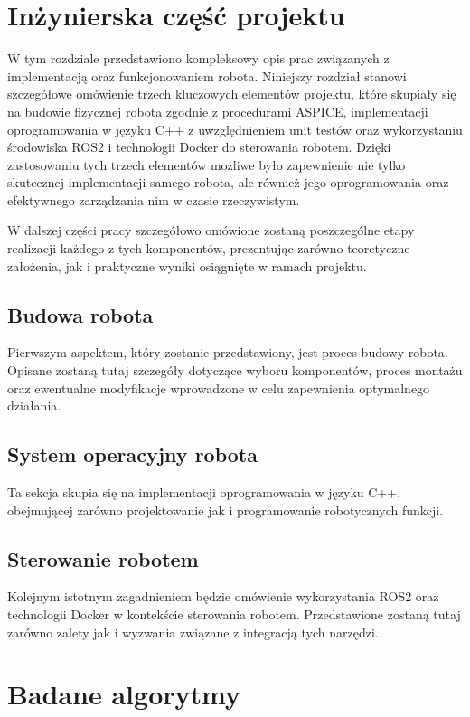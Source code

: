 \documentclass[12pt,twoside]{article}
\begin{document}
\section{Inżynierska część projektu}

W tym rozdziale przedstawiono kompleksowy opis prac związanych z implementacją oraz funkcjonowaniem robota. Niniejszy rozdział stanowi szczegółowe omówienie trzech kluczowych elementów projektu, które skupiały się na budowie fizycznej robota zgodnie z procedurami ASPICE, implementacji oprogramowania w języku C++ z uwzględnieniem unit testów oraz wykorzystaniu środowiska ROS2 i technologii Docker do sterowania robotem. Dzięki zastosowaniu tych trzech elementów możliwe było zapewnienie nie tylko skutecznej implementacji samego robota, ale również jego oprogramowania oraz efektywnego zarządzania nim w czasie rzeczywistym.

W dalszej części pracy szczegółowo omówione zostaną poszczególne etapy realizacji każdego z tych komponentów, prezentując zarówno teoretyczne założenia, jak i praktyczne wyniki osiągnięte w ramach projektu.

\subsection{Budowa robota}

Pierwszym aspektem, który zostanie przedstawiony, jest proces budowy robota. Opisane zostaną tutaj szczegóły dotyczące wyboru komponentów, proces montażu oraz ewentualne modyfikacje wprowadzone w celu zapewnienia optymalnego działania.

\subsection{System operacyjny robota}

Ta sekcja skupia się na implementacji oprogramowania w języku C++, obejmującej zarówno projektowanie jak i programowanie robotycznych funkcji. 

\subsection{Sterowanie robotem}

Kolejnym istotnym zagadnieniem będzie omówienie wykorzystania ROS2 oraz technologii Docker w kontekście sterowania robotem. Przedstawione zostaną tutaj zarówno zalety jak i wyzwania związane z integracją tych narzędzi.

\section{Badane algorytmy}
\end{document}
